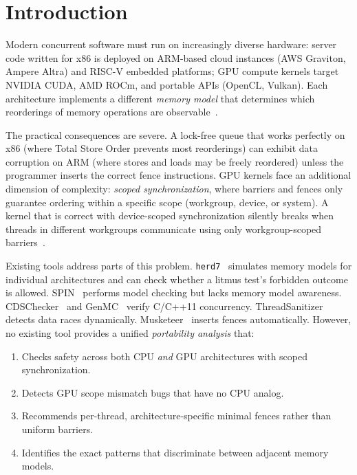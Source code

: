 \documentclass[10pt]{article}
\begin{document}
\section{Introduction}
\label{sec:intro}

Modern concurrent software must run on increasingly diverse hardware:
server code written for x86 is deployed on ARM-based cloud instances
(AWS Graviton, Ampere Altra) and RISC-V embedded platforms; GPU compute
kernels target NVIDIA CUDA, AMD ROCm, and portable APIs (OpenCL, Vulkan).
Each architecture implements a different \emph{memory model} that
determines which reorderings of memory operations are
observable~\cite{Adve2010, Alglave2014}.

The practical consequences are severe. A lock-free queue that works
perfectly on x86 (where Total Store Order prevents most reorderings) can
exhibit data corruption on ARM (where stores and loads may be freely
reordered) unless the programmer inserts the correct fence instructions.
GPU kernels face an additional dimension of complexity: \emph{scoped
synchronization}, where barriers and fences only guarantee ordering
within a specific scope (workgroup, device, or system). A kernel that
is correct with device-scoped synchronization silently breaks when
threads in different workgroups communicate using only workgroup-scoped
barriers~\cite{Sorensen2016, Alglave2015GPU}.

Existing tools address parts of this problem.
\texttt{herd7}~\cite{Alglave2014} simulates memory models for individual
architectures and can check whether a litmus test's forbidden outcome is
allowed. SPIN~\cite{Holzmann1997} performs model checking but lacks memory
model awareness. CDSChecker~\cite{Norris2013} and GenMC~\cite{Kokologiannakis2019}
verify C/C++11 concurrency. ThreadSanitizer~\cite{Serebryany2009} detects
data races dynamically. Musketeer~\cite{Alglave2014Musketeer} inserts
fences automatically. However, no existing tool provides a unified
\emph{portability analysis} that:

\begin{enumerate}[nosep]
\item Checks safety across both CPU \emph{and} GPU architectures with
      scoped synchronization.
\item Detects GPU scope mismatch bugs that have no CPU analog.
\item Recommends per-thread, architecture-specific minimal fences rather
      than uniform barriers.
\item Identifies the exact patterns that discriminate between adjacent
      memory models.
\end{enumerate}
\end{document}
